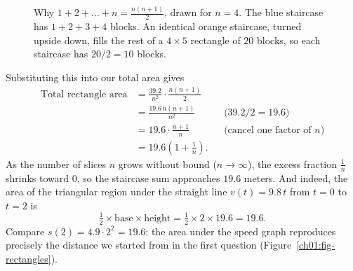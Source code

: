 \begin{figure}[htbp]
\centering
{}
\caption{Why $1+2+\dots+n=\frac{n(n+1)}{2}$, drawn for $n=4$. The blue staircase has $1+2+3+4$ blocks. An identical orange staircase, turned upside down, fills the rest of a $4\times 5$ rectangle of $20$ blocks, so each staircase has $20/2=10$ blocks.}
\label{ch01:fig-staircase}
\end{figure}

Substituting this into our total area gives
\begin{align*}
  \text{Total rectangle area}
  &= \frac{39.2}{n^2}\cdot\frac{n(n+1)}{2} \\
  &= \frac{19.6\,n(n+1)}{n^2} && \text{($39.2/2 = 19.6$)} \\
  &= 19.6\cdot\frac{n+1}{n} && \text{(cancel one factor of $n$)} \\
  &= 19.6\left(1 + \frac{1}{n}\right).
\end{align*}
As the number of slices $n$ grows without bound ($n \to \infty$), the excess fraction $\tfrac{1}{n}$ shrinks toward $0$, so the staircase sum
approaches $19.6$ meters. And indeed, the area of the triangular region under
the straight line $v(t) = 9.8\,t$ from $t=0$ to $t=2$ is
\[
  \tfrac{1}{2}\times\text{base}\times\text{height} = \tfrac{1}{2}\times 2 \times 19.6 = 19.6.
\]
Compare $s(2) = 4.9\cdot 2^2 = 19.6$: the area under the speed graph reproduces
precisely the distance we started from in the first question (Figure~\ref{ch01:fig-rectangles}).

